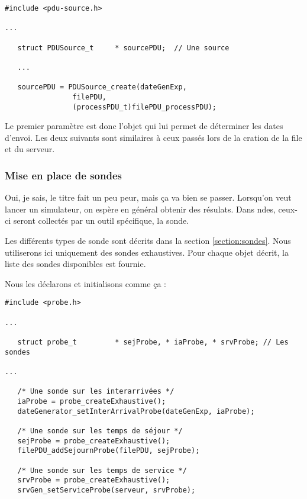 \begin{verbatim}
#include <pdu-source.h>

...

   struct PDUSource_t     * sourcePDU;  // Une source

   ...

   sourcePDU = PDUSource_create(dateGenExp, 
				filePDU,
				(processPDU_t)filePDU_processPDU);
\end{verbatim}

   Le premier paramètre est donc l'objet qui lui permet de déterminer
les dates d'envoi. Les deux suivants sont similaires à ceux passés
lors de la cration de la file et du serveur.
   
%
\subsubsection{Mise en place de sondes}

   Oui, je sais, le titre fait un peu peur, mais ça va bien se
passer. Lorsqu'on veut lancer un simulateur, on espère en général
obtenir des résulats. Dans {\sc ndes}, ceux-ci seront collectés par un
outil spécifique, la sonde.

   Les différents types de sonde sont décrits dans la section
\ref{section:sondes}. Nous utiliserons ici uniquement des sondes
exhaustives. Pour chaque objet décrit, la liste des sondes
disponibles est fournie. 

   Nous les déclarons et initialisons comme ça :

\begin{verbatim}
#include <probe.h>

...

   struct probe_t         * sejProbe, * iaProbe, * srvProbe; // Les sondes

...

   /* Une sonde sur les interarrivées */
   iaProbe = probe_createExhaustive();
   dateGenerator_setInterArrivalProbe(dateGenExp, iaProbe);

   /* Une sonde sur les temps de séjour */
   sejProbe = probe_createExhaustive();
   filePDU_addSejournProbe(filePDU, sejProbe);

   /* Une sonde sur les temps de service */
   srvProbe = probe_createExhaustive();
   srvGen_setServiceProbe(serveur, srvProbe);
\end{verbatim}

